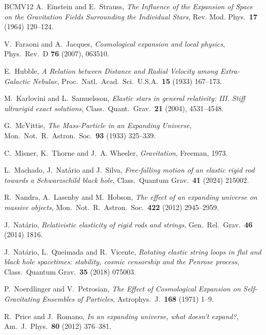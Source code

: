 \documentclass[10pt]{amsart}
\begin{document}
\begin{thebibliography}{BCMV12}
A.~Einstein and E.~Strauss, \emph{The Influence of the Expansion of Space on the Gravitation Fields Surrounding the Individual Stars}, Rev. Mod. Phys.\ {\bf 17} (1964) 120--124.

V.~Faraoni and A.~Jacques, \emph{Cosmological expansion and local physics}, Phys.\ Rev.\ D \textbf{76} (2007), 063510.

E.~Hubble, \emph{A Relation between Distance and Radial Velocity among Extra-Galactic Nebulae}, Proc.\ Natl.\ Acad.\ Sci.\ U.S.A.\ {\bf 15} (1933) 167--173.

M.~Karlovini and L.~Samuelsson, \emph{Elastic stars in general relativity: III. Stiff ultrarigid exact solutions}, Class.\ Quant.\ Grav.\ \textbf{21} (2004), 4531--4548.

G.~McVittie, \emph{The Mass-Particle in an Expanding Universe}, Mon.\ Not.\ R.\ Astron.\ Soc.\ {\bf 93} (1933) 325--339.

C.~Misner, K.~Thorne and J.~A. Wheeler, \emph{Gravitation}, Freeman, 1973.

L.~Machado, J.~Nat\'ario and J.~Silva, \emph{Free-falling motion of an elastic rigid rod towards a Schwarzschild black hole}, Class.\ Quantum Grav.\ \textbf{41} (2024) 215002.

R.~Nandra, A.~Lasenby and M.~Hobson, \emph{The effect of an expanding universe on massive objects}, Mon.\ Not.\ R.\ Astron.\ Soc.\ {\bf 422} (2012) 2945--2959.

J.~Nat\'ario, \emph{Relativistic elasticity of rigid rods and strings}, Gen.\ Rel.\ Grav.\ \textbf{46} (2014) 1816.

J.~Nat\'ario, L.~Queimada and R.~Vicente, \emph{Rotating elastic string loops in flat and black hole spacetimes: stability, cosmic censorship and the Penrose process}, Class.\ Quantum Grav.\ \textbf{35} (2018) 075003.

P.~Noerdlinger and V.~Petrosian, \emph{The Effect of Cosmological Expansion on Self-Gravitating Ensembles of Particles}, Astrophys.\ J.\ {\bf 168} (1971) 1--9.

R.~Price and J.~Romano, \emph{In an expanding universe, what doesn’t expand?}, Am.\ J.\ Phys.\ {\bf 80} (2012) 376--381.

\end{thebibliography}
\end{document}
